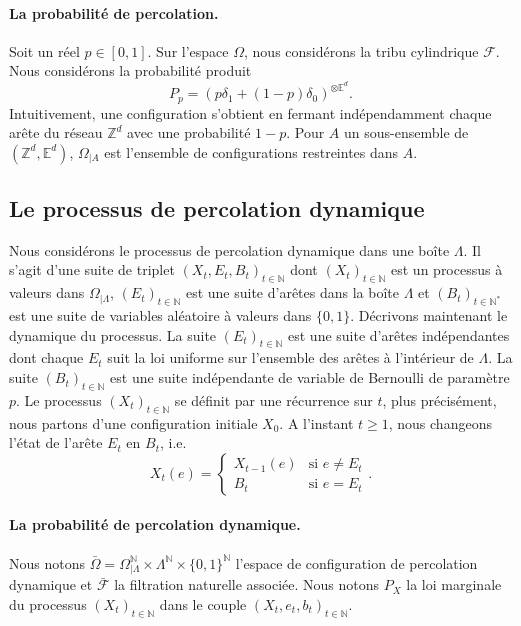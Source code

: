 \documentclass[titlepage,a4paper,12pt]{article}
\newcounter{th}
\begin{document}
\paragraph{La probabilité de percolation.} Soit un réel $p\in [0,1]$. Sur l'espace $\Omega$, nous considérons la tribu cylindrique $\mathcal{F}$. Nous considérons la probabilité produit $$P_p = (p\delta_1 +(1-p)\delta_0)^{\otimes\mathbb{E}^d}.$$ Intuitivement, une configuration s'obtient en fermant indépendamment chaque arête du réseau $\mathbb{Z}^d$ avec une probabilité $1-p$. Pour $A$ un sous-ensemble de $(\mathbb{Z}^d,\mathbb{E}^d)$, $\Omega_{|A}$ est l'ensemble de configurations restreintes dans $A$.
\subsection{Le processus de percolation dynamique}
Nous considérons le processus de percolation dynamique dans une boîte $\Lambda$. Il s'agit d'une suite de triplet $(X_t,E_t,B_t)_{t\in \mathbb{N}}$ dont $(X_t)_{t\in\mathbb{N}}$ est un processus à valeurs dans $\Omega_{|\Lambda}$, $(E_t)_{t\in\mathbb{N}}$ est une suite d'arêtes dans la boîte $\Lambda$ et $(B_t)_{t\in \mathbb{N}^*}$ est une suite de variables aléatoire à valeurs dans $\{0,1\}$. Décrivons maintenant le dynamique du processus. La suite $(E_t)_{t\in\mathbb{N}}$ est une suite d'arêtes indépendantes dont chaque $E_t$ suit la loi uniforme sur l'ensemble des arêtes à l'intérieur de $\Lambda$. La suite $(B_t)_{t\in\mathbb{N}}$ est une suite indépendante de variable de Bernoulli de paramètre $p$. Le processus $(X_t)_{t\in\mathbb{N}}$ se définit par une récurrence sur $t$, plus précisément, nous partons d'une configuration initiale $X_0$. A l'instant $t\geqslant 1$, nous changeons l'état de l'arête $E_t$ en $B_t$, i.e.
$$ X_t(e) = \left\lbrace \begin{array}{cc}
X_{t-1}(e) & \text{si }e\neq E_t \\
B_{t} & \text{si } e = E_t
\end{array} \right..
$$ 

\paragraph{La probabilité de percolation dynamique.}
Nous notons $\bar{\Omega} = \Omega_{|\Lambda}^\mathbb{N}\times \Lambda^\mathbb{N}\times\{0,1\}^\mathbb{N}$ l'espace de configuration de percolation dynamique et $\bar{\mathcal{F}}$ la filtration naturelle associée. Nous notons $P_X$ la loi marginale du processus $(X_t)_{t\in\mathbb{N}}$ dans le couple $(X_t,e_t,b_t)_{t\in\mathbb{N}}$.
\end{document}
